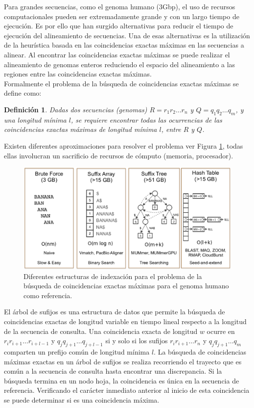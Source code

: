 \documentclass[12pt,a4paper]{article}
\newtheorem{mydef}{Definición}
\begin{document}
\indent
Para grandes secuencias, como el genoma humano (3Gbp), el uso de recursos computacionales pueden ser extremadamente grande y con un largo tiempo de ejecución. Es por ello que han surgido alternativas para reducir el tiempo de ejecución del alineamiento de secuencias. Una de esas alternativas es la utilización de la heurística basada en las coincidencias exactas máximas en las secuencias a alinear. Al encontrar las coincidencias exactas máximas se puede realizar el alineamiento de genomas enteros reduciendo el espacio del alineamiento a las regiones entre las coincidencias exactas máximas.\\
\indent
Formalmente el problema de la búsqueda de coincidencias exactas máximas se define como:
\begin{mydef}
  Dadas dos secuencias (genomas) $R=r_{1}r_{2}\hdots r_{n}$ y $Q=q_{1}q_{2}\hdots q_{m}$, y una longitud mínima $l$, se requiere encontrar todas las ocurrencias de las coincidencias exactas máximas de longitud mínima $l$, entre $R$ y $Q$.
\end{mydef}
Existen diferentes aproximaciones para resolver el problema ver Figura \ref{fig:state}, todas ellas involucran un sacrificio de recursos de cómputo (memoria, procesador).
\begin{figure}[h] 
   \centering 
   \includegraphics[scale=0.3]{state.eps} 
   \caption{Diferentes estructuras de indexación para el problema de la búsqueda de coincidencias exactas máximas para el genoma humano como referencia.} 
   \label{fig:state} 
 \end{figure}
\indent
El árbol de sufijos es una estructura de datos que permite la b\'usqueda de coincidencias exactas de longitud variable en tiempo lineal respecto a la longitud de la secuencia de consulta. Una coincidencia exacta de longitud $w$ ocurre en $r_{i}r_{i+1}\hdots r_{i+l-1}$ y $q_{j}q_{j+1}\hdots q_{j+l-1}$ si y solo si los sufijos $r_{i}r_{i+1}\hdots r_{n}$ y $q_{j}q_{j+1}\hdots q_{m}$ comparten un prefijo común de longitud mínima $l$. La búsqueda de coincidencias máximas exactas en un árbol de sufijos se realiza recorriendo el trayecto que es común a la secuencia de consulta hasta encontrar una discrepancia. Si la búsqueda termina en un nodo hoja, la coincidencia es única en la secuencia de referencia. Verificando el carácter inmediato anterior al inicio de esta coincidencia se puede determinar si es una coincidencia  máxima.\\
\end{document}
